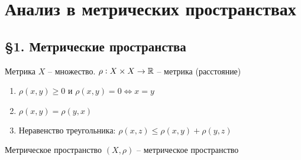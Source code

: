 \documentclass[12pt]{article}
\begin{document}
\section{Анализ в метрических пространствах}

\subsection{\S 1. Метрические пространства}

\begin{defin}{Метрика}
    $X$ -- множество. $\rho : X \times X \to \mathbb R$ -- метрика (расстояние)

    \begin{enumerate}
        \item $\rho(x, y) \geq 0$ и $\rho(x, y) = 0 \Leftrightarrow x = y$
        \item $\rho(x, y) = \rho(y, x)$
        \item Неравенство треугольника: $\rho(x, z) \leq \rho(x, y) + \rho(y, z)$
    \end{enumerate}
\end{defin}

\begin{defin}{Метрическое пространство}
    $(X, \rho)$ -- метрическое пространство
\end{defin}
\end{document}
